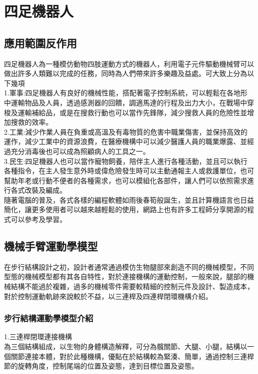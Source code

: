 \chapter{四足機器人}
\section{應用範圍反作用}
四足機器人為一種模仿動物四肢運動方式的機器人，利用電子元件驅動機械臂可以做出許多人類難以完成的任務，同時為人們帶來許多樂趣及益處。可大致上分為以下幾項\\

1.軍事:四足機器人有良好的機械性能，搭配著電子控制系統，可以輕鬆在各地形中運輸物品及人員，透過感測器的回饋，調適馬達的行程及出力大小，在戰場中穿梭及運輸補給品，或是在搜救行動也可以當作先鋒隊，減少搜救人員的危險性並增加搜救的效率。\\

2.工業:減少作業人員在負重或高溫及有毒物質的危害中職業傷害，並保持高效的運作，減少工業中的資源浪費，在醫療機構中可以減少醫護人員的職業爆露、並經過充分消毒後也可以成為照顧病人的工具之一。\\

3.民生:四足機器人也可以當作寵物飼養，陪伴主人進行各種活動，並且可以執行各種指令，在主人發生意外時或偉危險發生時可以主動通報主人或救護單位，也可幫助年老或行動不便者的各種需求，也可以模組化各部件，讓人們可以依照需求進行各式改裝及編成。\\

隨著電腦的普及，各式各樣的編程軟體如雨後春筍般誕生，並且計算機語言也日益簡化，讓更多使用者可以越來越輕鬆的使用，網路上也有許多工程師分享開源的程式可以參考及學習。\\[6pt]

\section{機械手臂運動學模型}

在步行結構設計之初，設計者通常通過模仿生物腿部來創造不同的機械模型，不同型態的機械模型都有其各自特性，對於連接機構的運動控制，一般來說，腿部的機械結構不能過於複雜，過多的機械零件需要較精細的控制元件及設計、製造成本，對於控制運動軌跡來說較於不益，以三連桿及四連桿閉環機構介紹。\\
\subsection{步行結構運動學模型介紹}
1.三連桿閉環連接機構\\
為三個結構組成，以生物的身體構造解釋，可分為髖關節、大腿、小腿，結構以一個關節連接本體，對於此種機構，優點在於結構較為緊湊、簡單，通過控制三連桿節的旋轉角度，控制尾端的位置及姿態，達到目標位置及姿態。\\

